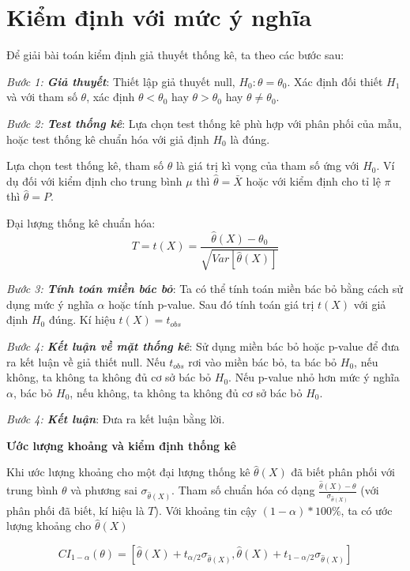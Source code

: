 \section{Kiểm định với mức ý nghĩa}
Để giải bài toán kiểm định giả thuyết thống kê, ta theo các bước sau:

\textit{Bước 1: \textbf{Giả thuyết}}:
Thiết lập giả thuyết null, $H_0: \theta = \theta_0$. Xác định đối thiết $H_1$ và với tham số $\theta$,
xác định $\theta < \theta_0$ hay $\theta > \theta_0$ hay $\theta \neq \theta_0$.

\textit{Bước 2: \textbf{Test thống kê}}:
Lựa chọn test thống kê phù hợp với phân phối của mẫu, hoặc test thống kê chuẩn hóa với 
giả định $H_0$ là đúng.

Lựa chọn test thống kê, tham số $\hat{\theta}$ là giá trị kì vọng của tham số ứng với $H_0$.
Ví dụ đối với kiểm định cho trung bình $\mu$ thì $\hat{\theta} = \bar{X}$ hoặc
với kiểm định cho tỉ lệ $\pi$ thì $\hat{\theta} = P$.

Đại lượng thống kê chuẩn hóa:
\begin{equation}
	T = t(X) = \frac{\hat{\theta}(X) - \theta_0}{\sqrt{Var[\hat{\theta}(X)]}}
\end{equation}

\textit{Bước 3: \textbf{Tính toán miền bác bỏ}}:
Ta có thể tính toán miền bác bỏ bằng cách sử dụng mức ý nghĩa $\alpha$ hoặc tính p-value.
Sau đó tính toán giá trị $t(X)$ với giả định $H_0$ đúng. Kí hiệu $t(X) = t_{obs}$

\textit{Bước 4: \textbf{Kết luận về mặt thống kê}}:
Sử dụng miền bác bỏ hoặc p-value để đưa ra kết luận về giả thiết null. Nếu $t_{obs}$
rơi vào miền bác bỏ, ta bác bỏ $H_0$, nếu không, ta không ta không đủ cơ sở bác bỏ $H_0$.
Nếu p-value nhỏ hơn mức ý nghĩa $\alpha$, bác bỏ $H_0$, nếu không, ta không ta không đủ cơ sở bác bỏ $H_0$.

\textit{Bước 4: \textbf{Kết luận}}:
Đưa ra kết luận bằng lời.

\textbf{Ước lượng khoảng và kiểm định thống kê}

Khi ước lượng khoảng cho một đại lượng thống kê $\hat{\theta}(X)$ đã biết phân phối
với trung bình $\theta$ và phương sai $\sigma_{\hat{\theta}(X)}$. Tham số chuẩn hóa 
có dạng $\frac{\hat{\theta}(X) - \theta}{\sigma_{\hat{\theta}(X)}}$ (với phân phối đã biết, 
kí hiệu là $T$). Với khoảng tin cậy $(1 - \alpha) * 100\%$, ta có ước lượng khoảng cho $\hat{\theta}(X)$

\begin{equation}
	CI_{1- \alpha}(\theta) = [\hat{\theta}(X) + t_{\alpha/2} \sigma_{\hat{\theta}(X)}, 
	\hat{\theta}(X) + t_{1 - \alpha/2} \sigma_{\hat{\theta}(X)}]
\end{equation}

